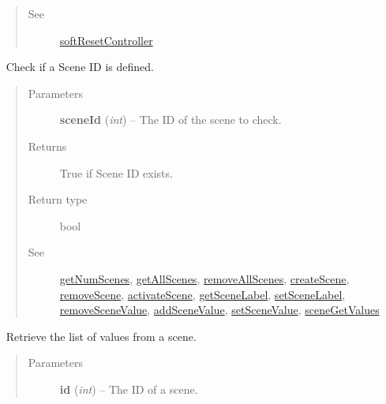 \documentclass[letterpaper,10pt,english]{sphinxmanual}
\begin{document}
\begin{fulllineitems}
\begin{fulllineitems}
\begin{quote}
\begin{description}
\item[{See}] \leavevmode
{\hyperref[libopenzwave:softresetcontroller]{softResetController}}

\end{description}\end{quote}

\end{fulllineitems}


\begin{fulllineitems}
\label{libopenzwave:libopenzwave.PyManager.sceneExists}~\label{libopenzwave:sceneexists}
Check if a Scene ID is defined.
\begin{quote}\begin{description}
\item[{Parameters}] \leavevmode
\textbf{sceneId} (\emph{int}) -- The ID of the scene to check.

\item[{Returns}] \leavevmode
True if Scene ID exists.

\item[{Return type}] \leavevmode
bool

\item[{See}] \leavevmode
{\hyperref[libopenzwave:getnumscenes]{getNumScenes}}, {\hyperref[libopenzwave:getallscenes]{getAllScenes}}, {\hyperref[libopenzwave:removeallscenes]{removeAllScenes}}, {\hyperref[libopenzwave:createscene]{createScene}}, {\hyperref[libopenzwave:removescene]{removeScene}}, {\hyperref[libopenzwave:activatescene]{activateScene}}, {\hyperref[libopenzwave:getscenelabel]{getSceneLabel}}, {\hyperref[libopenzwave:setscenelabel]{setSceneLabel}}, {\hyperref[libopenzwave:removescenevalue]{removeSceneValue}}, {\hyperref[libopenzwave:addscenevalue]{addSceneValue}}, {\hyperref[libopenzwave:setscenevalue]{setSceneValue}}, {\hyperref[libopenzwave:scenegetvalues]{sceneGetValues}}

\end{description}\end{quote}

\end{fulllineitems}


\begin{fulllineitems}
\label{libopenzwave:libopenzwave.PyManager.sceneGetValues}~\label{libopenzwave:scenegetvalues}
Retrieve the list of values from a scene.
\begin{quote}\begin{description}
\item[{Parameters}] \leavevmode
\textbf{id} (\emph{int}) -- The ID of a scene.


\end{description}
\end{quote}
\end{fulllineitems}
\end{fulllineitems}
\end{document}
